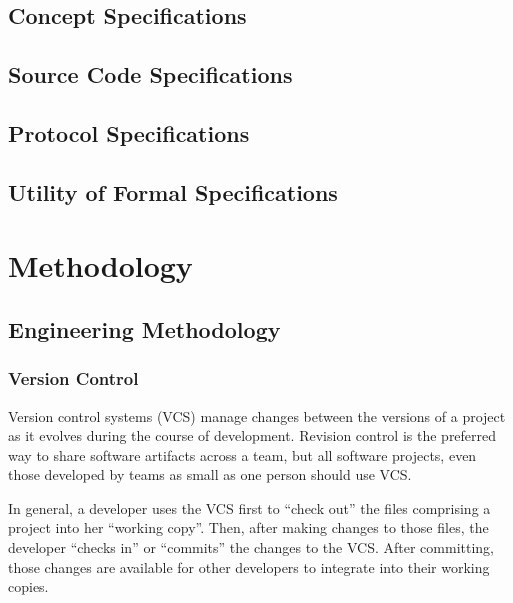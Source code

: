 \subsection{Concept Specifications}

\subsection{Source Code Specifications}

\subsection{Protocol Specifications}

\subsection{Utility of Formal Specifications}

\section{Methodology}

\subsection{Engineering Methodology}



\subsubsection{Version Control}

Version control systems (VCS) manage changes between the versions of a
project as it evolves during the course of development. Revision
control is the preferred way to share software artifacts across a
team, but all software projects, even those developed by teams as
small as one person should use VCS.

In general, a developer uses the VCS first to ``check out'' the files
comprising a project into her ``working copy''. Then, after making
changes to those files, the developer ``checks in'' or ``commits'' the
changes to the VCS. After committing, those changes are available for
other developers to integrate into their working copies.

